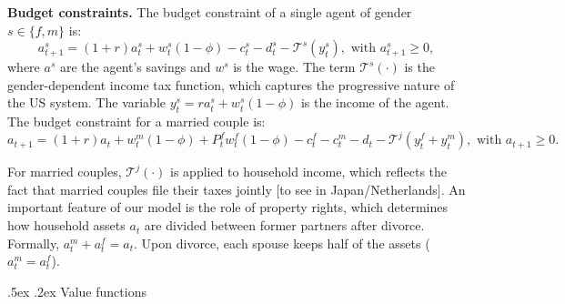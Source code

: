 \documentclass[12pt]{article}
\makeatletter
\numberwithin{table}{section}
\renewcommand\subsection{\@startsection{subsection}{1}{0cm}{-1.5ex \@plus
		-.2ex \@minus -.2ex}%
	{.5ex \@plus.2ex} {\normalfont\bfseries}}
\makeatother
\begin{document}
\textbf{Budget constraints.} The budget constraint of a single agent of gender  $s\in\{f,m\}$ is:
\begin{equation}\label{eq:bcs}
	a^s_{t+1}=(1+r) a^s_t+w^s_t(1-\phi)-c^s_t-d^s_t-\mathcal{T}^s(y^s_t), \text{ with }a^s_{t+1}\geq0,
\end{equation}
where $a^s$ are the agent's savings and $w^s$ is the wage. The term $\mathcal{T}^s(\cdot)$ is the gender-dependent income tax function, which captures the progressive nature of the US system. The variable $y^s_t=r a^s_t+ w^s_t(1-\phi)$ is the income of the agent.
The budget constraint for a married couple is:
\begin{equation}\label{eq:bcm}
	a_{t+1}=(1+r) a_t+w^m_t(1-\phi)+P^f_t w^f_t(1-\phi)-c^f_t-c^m_t-d_t-\mathcal{T}^j(y^f_t+y^m_t), \text{ with }a_{t+1}\geq0.
\end{equation}

For married couples, $\mathcal{T}^j(\cdot)$ is applied to household income, which reflects the fact that married couples file their taxes jointly [to see in Japan/Netherlands]. An important feature of our model is the role of property rights, which determines how household assets $a_t$ are divided between former partners after divorce. Formally, $a^m_t+a^f_t=a_t.$ Upon divorce, each spouse keeps half of the assets ($a^m_t=a^f_t$).

\subsection{Value functions}
\end{document}
